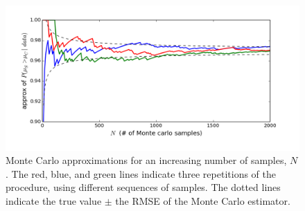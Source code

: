 \documentclass[12pt]{article}
\begin{document}
\begin{figure}
  \begin{center}
    \includegraphics[trim=0 0.75cm 0 0, clip, width=1\textwidth]{pygmalion-MC.png}
  \end{center}
  \caption{Monte Carlo approximations for an increasing number of samples, $N$. The red, blue, and green lines indicate three repetitions of the procedure, using different sequences of samples.  The dotted lines indicate the true value $\pm$ the RMSE of the Monte Carlo estimator.}
  \label{figure:pygmalion-MC}
\end{figure}
\end{document}
